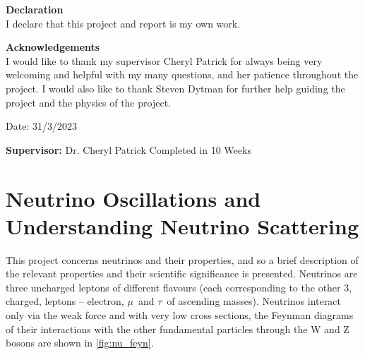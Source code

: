 \documentclass[a4paper,12pt]{article}
\newcommand{\efn}{e4$\nu$}
\newcommand{\Mu}{$\mu$}
\newcommand{\Tau}{$\tau$}
\begin{document}
\vspace{0.5cm}

\begin{center}
    \textbf{\normalsize Declaration} \\
    \small
    I declare that this project and report is my own work.
\end{center}

\vspace{0.5cm}

\begin{center}
    \textbf{\normalsize Acknowledgements} \\
    \small
    I would like to thank my supervisor Cheryl Patrick for always being very welcoming and helpful with my many questions, and her patience throughout the project.
    I would also like to thank Steven Dytman for further help guiding the project and the physics of the project.
\end{center}

\vspace{1.5cm}
\hfill Date:  31/3/2023

{\bf Supervisor:} Dr. Cheryl Patrick
\hfill
Completed in 10 Weeks
\newpage


\tableofcontents

\newpage

\pagestyle{plain}
\setcounter{page}{1}

\section{Neutrino Oscillations and Understanding Neutrino Scattering}
This project concerns neutrinos and their properties, and so a brief description of the relevant properties and their scientific significance is presented.
Neutrinos are three uncharged leptons of different flavours (each corresponding to the other 3, charged, leptons -- electron, \Mu\ and \Tau\ of ascending masses).
Neutrinos interact only via the weak force and with very low cross sections, the Feynman diagrams of their interactions with the other fundamental particles through the W and Z bosons are shown in \cref{fig:nu_feyn}.
\end{document}
